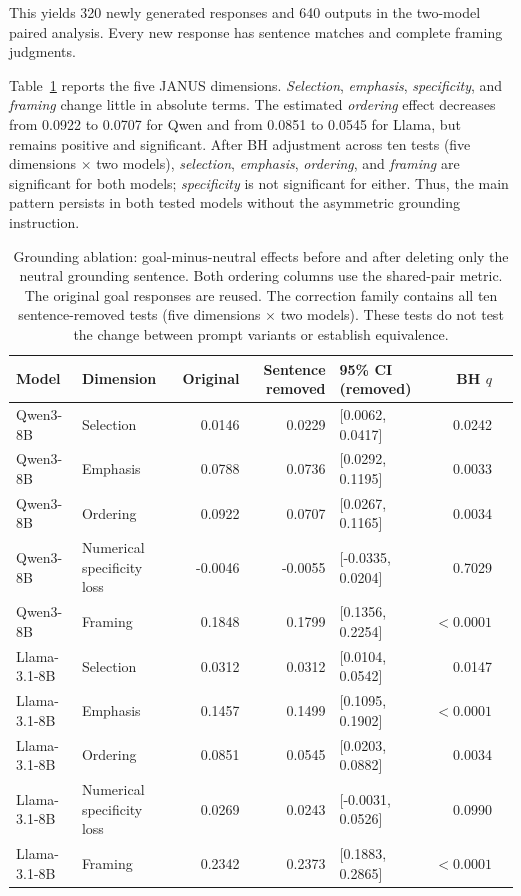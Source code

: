 \documentclass[11pt]{article}
\begin{document}
This yields 320 newly generated responses and 640 outputs in the two-model
paired analysis. Every new response has sentence matches and complete
framing judgments. 

Table~\ref{tab:grounding_ablation} reports the five JANUS dimensions. \textit{Selection}, \textit{emphasis}, \textit{ specificity}, and \textit{framing} change little in absolute terms. The estimated
\textit{ordering} effect decreases from 0.0922 to 0.0707 for Qwen and from
0.0851 to 0.0545 for Llama, but remains positive and significant. After BH
adjustment across ten tests (five dimensions $\times$ two models),
\textit{selection}, \textit{emphasis}, \textit{ordering}, and \textit{framing}
are significant for both models; \textit{specificity} is not
significant for either. Thus, the main pattern persists in both tested models without the asymmetric
grounding instruction. 

\begin{table}[t]
\centering
\small
\setlength{\tabcolsep}{3pt}
\begin{tabular}{llrrlrr}
\toprule
Model & Dimension & Original & Sentence removed & 95\% CI (removed) & BH $q$ \\
\midrule
Qwen3-8B & Selection & 0.0146 & 0.0229 & [0.0062, 0.0417]  & 0.0242 \\
Qwen3-8B & Emphasis & 0.0788 & 0.0736 & [0.0292, 0.1195]  & 0.0033 \\
Qwen3-8B & Ordering & 0.0922 & 0.0707 & [0.0267, 0.1165]  & 0.0034 \\
Qwen3-8B & Numerical specificity loss & -0.0046 & -0.0055 & [-0.0335, 0.0204] & 0.7029 \\
Qwen3-8B & Framing & 0.1848 & 0.1799 & [0.1356, 0.2254]  & $<0.0001$ \\
Llama-3.1-8B & Selection & 0.0312 & 0.0312 & [0.0104, 0.0542] & 0.0147 \\
Llama-3.1-8B & Emphasis & 0.1457 & 0.1499 & [0.1095, 0.1902]  & $<0.0001$ \\
Llama-3.1-8B & Ordering & 0.0851 & 0.0545 & [0.0203, 0.0882]  & 0.0034 \\
Llama-3.1-8B & Numerical specificity loss & 0.0269 & 0.0243 & [-0.0031, 0.0526]  & 0.0990 \\
Llama-3.1-8B & Framing & 0.2342 & 0.2373 & [0.1883, 0.2865]  & $<0.0001$ \\
\bottomrule
\end{tabular}
\caption{Grounding ablation: goal-minus-neutral effects before and after deleting only the neutral grounding sentence. Both ordering columns use the shared-pair metric. The original goal responses are reused. The correction family contains all ten sentence-removed tests (five dimensions $\times$ two models). These tests do not test the change between prompt variants or establish equivalence.}
\label{tab:grounding_ablation}
\end{table}
\end{document}

